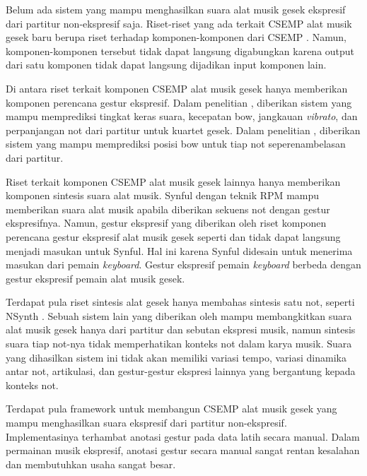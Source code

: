 Belum ada sistem yang mampu menghasilkan suara alat musik gesek ekspresif dari partitur non-ekspresif saja. Riset-riset yang ada terkait CSEMP alat musik gesek baru berupa riset terhadap komponen-komponen dari CSEMP \parencite{marchini2014quartet} \parencite{yu2017bowing} \parencite{lindemann2007rpm} \parencite{yang2016synthesis} \parencite{nsynth2017}. Namun, komponen-komponen tersebut tidak dapat langsung digabungkan karena output dari satu komponen tidak dapat langsung dijadikan input komponen lain.

Di antara riset terkait komponen CSEMP alat musik gesek hanya memberikan komponen perencana gestur ekspresif. Dalam penelitian \citet{marchini2014quartet}, diberikan sistem yang mampu memprediksi tingkat keras suara, kecepatan bow, jangkauan \textit{vibrato}, dan perpanjangan not dari partitur untuk kuartet gesek. Dalam penelitian \citet{yu2017bowing}, diberikan sistem yang mampu memprediksi posisi bow untuk tiap not seperenambelasan dari partitur.

Riset terkait komponen CSEMP alat musik gesek lainnya hanya memberikan komponen sintesis suara alat musik. Synful dengan teknik RPM \parencite{lindemann2007rpm} mampu memberikan suara alat musik apabila diberikan sekuens not dengan gestur ekspresifnya. Namun, gestur ekspresif yang diberikan oleh riset komponen perencana gestur ekspresif alat musik gesek seperti \parencite{marchini2014quartet} dan \parencite{yu2017bowing} tidak dapat langsung menjadi masukan untuk Synful. Hal ini karena Synful didesain untuk menerima masukan dari pemain \textit{keyboard}. Gestur ekspresif pemain \textit{keyboard} berbeda dengan gestur ekspresif pemain alat musik gesek.

Terdapat pula riset sintesis alat gesek hanya membahas sintesis satu not, seperti NSynth \parencite{nsynth2017}. Sebuah sistem lain yang diberikan oleh \citet{yang2016synthesis} mampu membangkitkan suara alat musik gesek hanya dari partitur dan sebutan ekspresi musik, namun sintesis suara tiap not-nya tidak memperhatikan konteks not dalam karya musik. Suara yang dihasilkan sistem ini tidak akan memiliki variasi tempo, variasi dinamika antar not, artikulasi, dan gestur-gestur ekspresi lainnya yang bergantung kepada konteks not.

Terdapat pula framework untuk membangun CSEMP alat musik gesek yang mampu menghasilkan suara ekspresif dari partitur non-ekspresif. \parencite{perez2015} Implementasinya terhambat anotasi gestur pada data latih secara manual. Dalam permainan musik ekspresif, anotasi gestur secara manual sangat rentan kesalahan dan membutuhkan usaha sangat besar.


